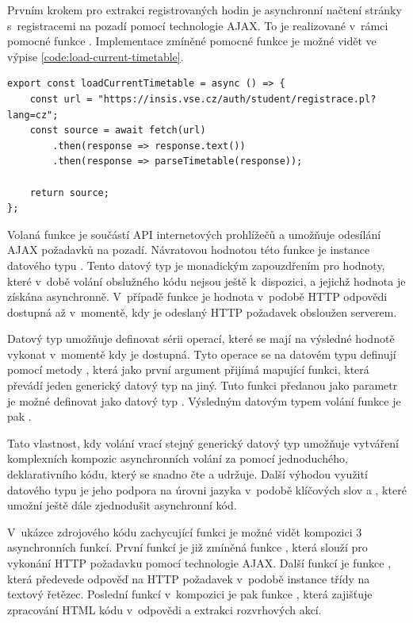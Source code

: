 Prvním krokem pro extrakci registrovaných hodin je asynchronní načtení stránky s~registracemi na pozadí pomocí technologie AJAX. To je realizované v~rámci pomocné funkce . Implementace zmíněné pomocné funkce je možné vidět ve výpise \ref{code:load-current-timetable}.

    \begin{lstlisting}[label={code:load-current-timetable}, caption = {Implementace funkce \code{loadCurrentTimetable} (vlastní zpracování)}]
export const loadCurrentTimetable = async () => {
    const url = "https://insis.vse.cz/auth/student/registrace.pl?lang=cz";
    const source = await fetch(url)
        .then(response => response.text())
        .then(response => parseTimetable(response));

    return source;
};
\end{lstlisting}

Volaná funkce  je součástí API internetových prohlížečů a umožňuje odesílání AJAX požadavků na pozadí. Návratovou hodnotou této funkce je instance datového typu . Tento datový typ je monadickým zapouzdřením pro hodnoty, které v~době volání obslužného kódu nejsou ještě k~dispozici, a jejichž hodnota je získána asynchronně. V~případě funkce  je hodnota v~podobě HTTP odpovědi dostupná až v~momentě, kdy je odeslaný HTTP požadavek obsloužen serverem.

Datový typ  umožňuje definovat sérii operací, které se mají na výsledné hodnotě vykonat v~momentě kdy je dostupná. Tyto operace se na datovém typu  definují pomocí metody , která jako první argument přijímá mapující funkci, která převádí jeden generický datový typ na jiný. Tuto funkci předanou jako parametr je možné definovat jako datový typ . Výsledným datovým typem volání funkce  je pak  \cite[kap. 13.2]{flanagan_javascript_2020}.

Tato vlastnost, kdy volání vrací stejný generický datový typ umožňuje vytváření komplexních kompozic asynchronních volání za pomocí jednoduchého, deklarativního kódu, který se snadno čte a udržuje. Další výhodou využití datového typu  je jeho podpora na úrovni jazyka v~podobě klíčových slov  a , které umožní ještě dále zjednodušit asynchronní kód. 

V~ukázce zdrojového kódu zachycující funkci  je možné vidět kompozici 3 asynchronních funkcí. První funkcí je již zmíněná funkce , která slouží pro vykonání HTTP požadavku pomocí technologie AJAX. Další funkcí je funkce , která předevede odpověď na HTTP požadavek v~podobě instance třídy  na textový řetězec. Poslední funkcí v~kompozici je pak funkce , která zajišťuje zpracování HTML kódu v~odpovědi a extrakci rozvrhových akcí.

